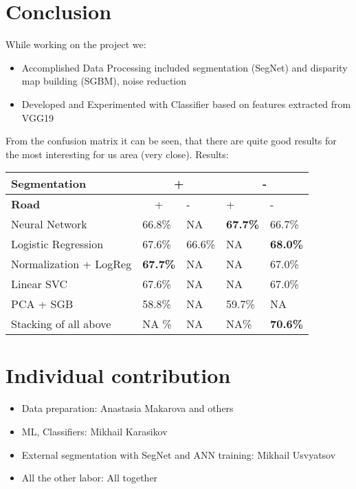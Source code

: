 \documentclass{article}
\begin{document}
    \section{Conclusion}\label{conclusion}
While working on the project we:
	\begin{itemize}
		\item Accomplished Data Processing included segmentation (SegNet) and disparity map building (SGBM), noise reduction
		\item Developed and Experimented with Classifier based on features extracted from VGG19 
	\end{itemize}
	From the confusion matrix it can be seen, that there are quite good results for the most interesting for us area (very close). 
	Results:

    \begin{table}
    \begin{tabular}{|l|l|l|l|l|} 
    \hline 
    \textbf{Segmentation }& \multicolumn{2}{c|}{+} & \multicolumn{2}{c|}{-} \\ 
    \hline 
    \textbf{Road} & \multicolumn{1}{c|}{+} & - & + & - \\ 
    \hline 
    Neural Network & 66.8\% & NA & \textbf{67.7\%} & 66.7\% \\ 
    \hline 
    Logistic Regression & 67.6\% & 66.6\% & NA & \textbf{68.0\%} \\ 
    \hline 
    Normalization + LogReg & \textbf{67.7\%} & NA & NA & 67.0\% \\ 
    \hline 
    Linear SVC & 67.6\% & NA & NA & 67.0\% \\ 
    \hline 
    PCA + SGB & 58.8\% & NA & 59.7\% & NA \\ 
    \hline 
    Stacking of all above & NA \% & NA & NA\% & \textbf{70.6\%} \\ 
    \hline 
    \end{tabular}
    \end{table}

    \newpage
    \section{Individual contribution} 
    \begin{itemize} 
      \item Data preparation: Anastasia Makarova and others 
      \item ML, Classifiers: Mikhail Karasikov 
      \item External segmentation with SegNet and ANN training: Mikhail Usvyatsov 
      \item All the other labor: All together
    \end{itemize}


    
    
    
    
\end{document}
